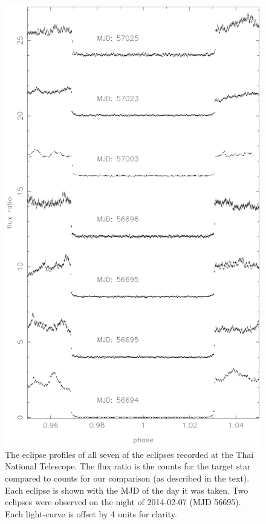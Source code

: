 \documentclass[a4paper,fleqn,usenatbib]{mnras}
\begin{document}
\begin{figure}
\centering
\includegraphics[width=\columnwidth]{images/stacked_eclipses.eps}
\caption{The eclipse profiles of all seven of the eclipses recorded at the Thai National Telescope. The flux ratio is the counts for the target star compared to counts for our comparison (as described in the text). Each eclipse is shown with the MJD of the day it was taken. Two eclipses were observed on the night of 2014-02-07 (MJD 56695). Each light-curve is offset by 4 units for clarity.}
\label{fig:stacked-eclipses}
\end{figure}
\end{document}
